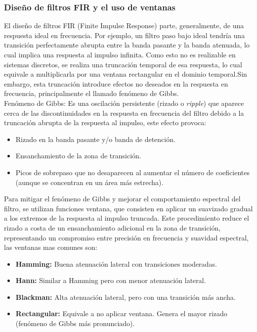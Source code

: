 \documentclass[12pt]{article}
\begin{document}
	\subsubsection{Diseño de filtros FIR y el uso de ventanas}
	El diseño de filtros FIR (Finite Impulse Response) parte, generalmente, de una respuesta ideal en frecuencia. Por ejemplo, un filtro paso bajo ideal tendría una transición perfectamente abrupta entre la banda pasante y la banda atenuada, lo cual implica una respuesta al impulso infinita. Como esto no es realizable en sistemas discretos, se realiza una truncación temporal de esa respuesta, lo cual equivale a multiplicarla por una ventana rectangular en el dominio temporal.Sin embargo, esta truncación introduce efectos no deseados en la respuesta en frecuencia, principalmente el llamado fenómeno de Gibbs. \\ 
	
	Fenómeno de Gibbs: Es una oscilación persistente (rizado o \textit{ripple}) que aparece cerca de las discontinuidades en la respuesta en frecuencia del filtro debido a la truncación abrupta de la respuesta al impulso, este efecto provoca:
	
	\begin{itemize}
		\item Rizado en la banda pasante y/o banda de detención.
		\item Ensanchamiento de la zona de transición.
		\item Picos de sobrepaso que no desaparecen al aumentar el número de coeficientes (aunque se concentran en un área más estrecha).
	\end{itemize}
	
	Para mitigar el fenómeno de Gibbs y mejorar el comportamiento espectral del filtro, se utilizan funciones ventana, que consisten en aplicar un suavizado gradual a los extremos de la respuesta al impulso truncada. Este procedimiento reduce el rizado a costa de un ensanchamiento adicional en la zona de transición, representando un compromiso entre precisión en frecuencia y suavidad espectral, las ventanas mas comunes son:
	
	\begin{itemize}
		\item \textbf{Hamming:} Buena atenuación lateral con transiciones moderadas.
		\item \textbf{Hann:} Similar a Hamming pero con menor atenuación lateral.
		\item \textbf{Blackman:} Alta atenuación lateral, pero con una transición más ancha.
		\item \textbf{Rectangular:} Equivale a no aplicar ventana. Genera el mayor rizado (fenómeno de Gibbs más pronunciado).
	\end{itemize}
	
\end{document}
